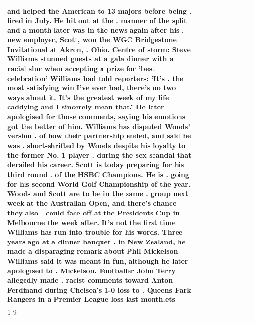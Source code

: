 \begin{table}[H]
\begin{tabular}{lllrlllll}
and helped the American to 13 majors before being . fired in July. He hit out at the . manner of the split and a month later was in the news again after his . new employer, Scott, won the WGC Bridgestone Invitational at Akron, . Ohio. Centre of storm: Steve Williams stunned guests at a gala dinner with a racial slur when accepting a prize for 'best celebration' Williams had told reporters: 'It's . the most satisfying win I've ever had, there's no two ways about it. It's the greatest week of my life caddying and I sincerely mean that.' He later apologised for those comments, saying his emotions got the better of him. Williams has disputed Woods' version . of how their partnership ended, and said he was . short-shrifted by Woods despite his loyalty to the former No. 1 player . during the sex scandal that derailed his career. Scott is today preparing for his third round . of the HSBC Champions. He is . going for his second World Golf Championship of the year. Woods and Scott are to be in the same . group next week at the Australian Open, and there's chance they also . could face off at the Presidents Cup in Melbourne the week after. It's not the first time Williams has run into trouble for his words. Three years ago at a dinner banquet . in New Zealand, he made a disparaging remark about Phil Mickelson. Williams said it was meant in fun, although he later apologised to . Mickelson. Footballer John Terry allegedly made . racist comments toward Anton Ferdinand during Chelsea's 1-0 loss to . Queens Park Rangers in a Premier League loss last month.ets \\
\cline{1-9}

\end{tabular}
\end{table}
